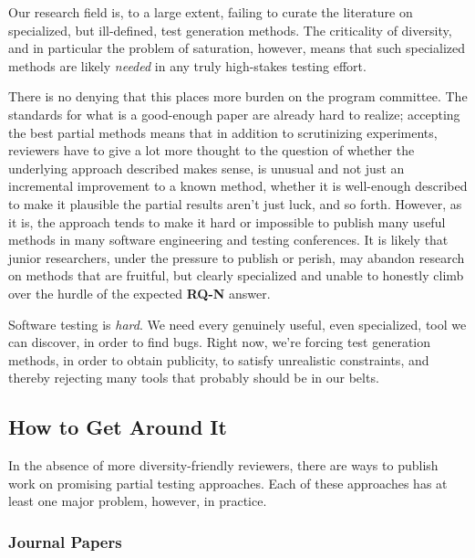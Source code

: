 \documentclass[sigplan,screen]{acmart}
\begin{document}
Our research field is, to a large extent, failing to curate the
literature on specialized, but ill-defined, test generation methods.
The criticality of diversity, and in particular the problem of
saturation, however, means that such specialized methods are likely
\emph{needed} in any truly high-stakes testing effort.

There is no denying that this places more burden on the program
committee.  The standards for what is a good-enough paper are already
hard to realize; accepting the best partial methods means that in
addition to scrutinizing experiments, reviewers have to give a lot
more thought to the question of whether the underlying approach
described makes sense, is unusual and not just an incremental
improvement to a known method, whether it is well-enough described to
make it plausible the partial results aren't just luck, and so forth.
However, as it is, the approach tends to make it hard or impossible to
publish many useful methods in many software engineering and testing
conferences.  It is likely that junior researchers, under the pressure
to publish or perish, may abandon research on methods that are fruitful, but
clearly specialized and unable to honestly climb over the hurdle of
the expected {\bf RQ-N} answer.

Software testing is \emph{hard}.  We need every genuinely useful, even
specialized, tool we can discover, in order to find bugs.  Right now,
we're forcing test generation methods, in order to obtain publicity,
to satisfy unrealistic constraints, and thereby rejecting many tools
that probably should be in our belts.

\subsection{How to Get Around It}

In the absence of more diversity-friendly reviewers, there are ways to
publish work on promising partial testing approaches.  Each of these
approaches has at least one major problem, however, in practice.

\subsubsection{Journal Papers}
\end{document}
